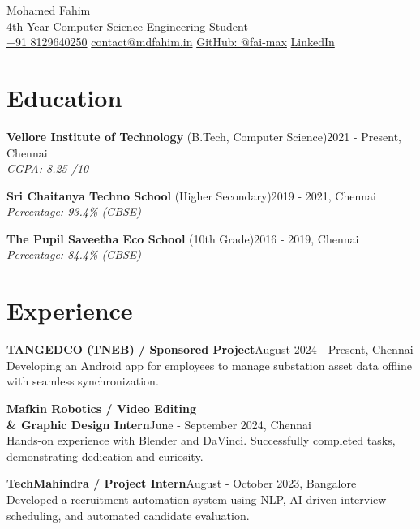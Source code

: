 \documentclass[10pt, letterpaper]{article}
\begin{document}
\begin{center}
    {\fontsize{22pt}{22pt}\selectfont \textcolor{primaryColor}{Mohamed Fahim}}\\
    \vspace{3pt}
    {\textcolor{sectionColor}{4th Year Computer Science Engineering Student}}\\
    \vspace{3pt}
    \href{tel:+918129640250}{+91 8129640250} \quad
    \href{mailto:contact@mdfahim.in}{contact@mdfahim.in} \quad
    \href{https://github.com/fai-max}{GitHub: @fai-max} \quad
    \href{https://www.linkedin.com/in/mohamed-fahim-79308829a}{LinkedIn}
\end{center}

\section{Education}
\textbf{Vellore Institute of Technology} (B.Tech, Computer Science)\hfill 2021 - Present, Chennai\\
\textit{CGPA: 8.25 /10}

\textbf{Sri Chaitanya Techno School} (Higher Secondary)\hfill 2019 - 2021, Chennai\\
\textit{Percentage: 93.4\% (CBSE)}

\textbf{The Pupil Saveetha Eco School} (10th Grade)\hfill 2016 - 2019, Chennai\\
\textit{Percentage: 84.4\% (CBSE)}

\section{Experience}
\textbf{TANGEDCO (TNEB) / Sponsored Project}\hfill August 2024 - Present, Chennai\\
Developing an Android app for employees to manage substation asset data offline with seamless synchronization.

\textbf{Mafkin Robotics / Video Editing \\& Graphic Design Intern}\hfill June - September 2024, Chennai\\
Hands-on experience with Blender and DaVinci. Successfully completed tasks, demonstrating dedication and curiosity.

\textbf{TechMahindra / Project Intern}\hfill August - October 2023, Bangalore\\
Developed a recruitment automation system using NLP, AI-driven interview scheduling, and automated candidate evaluation.
\end{document}
